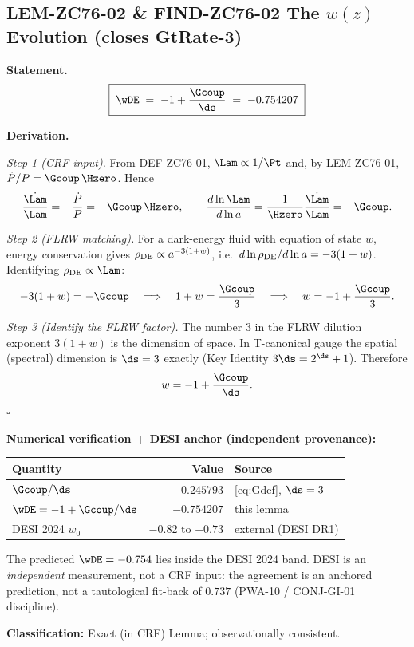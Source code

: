 \documentclass[12pt, a4paper]{article}
\begin{document}
\subsection{LEM-ZC76-02 \& FIND-ZC76-02\quad
  The $w(z)$ Evolution (closes GtRate-3)}
\label{sec:lem02}


\begin{formalbox}[title={LEM-ZC76-02: Dark-Energy Equation of State
  ($R_0{\to}R_{\max}$, Exact in CRF)}]

\textbf{Statement.}
\begin{equation}
  \boxed{\;\wDE \;=\; -1 + \frac{\Gcoup}{\ds}
  \;=\; -0.754207\;}
  \label{eq:wDE}
\end{equation}

\textbf{Derivation.}

\textit{Step 1 (CRF input).}
From DEF-ZC76-01, $\Lam \propto 1/\Pt$ and, by LEM-ZC76-01,
$\dot{P}/P = \Gcoup\,\Hzero$. Hence
\[
  \frac{\dot{\Lam}}{\Lam} = -\frac{\dot{P}}{P} = -\Gcoup\,\Hzero,
  \qquad
  \frac{d\ln\Lam}{d\ln a} = \frac{1}{\Hzero}\frac{\dot{\Lam}}{\Lam}
  = -\Gcoup .
\]

\textit{Step 2 (FLRW matching).}
For a dark-energy fluid with equation of state $w$, energy conservation
gives $\rho_{\rm DE}\propto a^{-3(1+w)}$, i.e.\
$d\ln\rho_{\rm DE}/d\ln a = -3(1+w)$. Identifying
$\rho_{\rm DE}\propto\Lam$:
\[
  -3(1+w) = -\Gcoup
  \quad\Longrightarrow\quad
  1 + w = \frac{\Gcoup}{3}
  \quad\Longrightarrow\quad
  w = -1 + \frac{\Gcoup}{3}.
\]

\textit{Step 3 (Identify the FLRW factor).}
The number $3$ in the FLRW dilution exponent $3(1+w)$ is the dimension
of space. In T-canonical gauge the spatial (spectral) dimension is
$\ds = 3$ exactly (Key Identity $3\ds = 2^{\ds}+1$). Therefore
\[
  w = -1 + \frac{\Gcoup}{\ds}.
\]
\hfill$\square$

\textbf{Numerical verification + DESI anchor (independent provenance):}
\begin{center}
{\small\renewcommand{\arraystretch}{1.25}
\begin{tabular}{@{}lrl@{}}
\toprule
Quantity & Value & Source \\
\midrule
$\Gcoup/\ds$            & $0.245793$ & \eqref{eq:Gdef}, $\ds=3$ \\
$\wDE = -1 + \Gcoup/\ds$ & $-0.754207$ & this lemma \\
DESI 2024 $w_0$         & $-0.82$ to $-0.73$ & external (DESI DR1) \\
\bottomrule
\end{tabular}}
\end{center}
The predicted $\wDE = -0.754$ lies inside the DESI 2024 band. DESI is an
\emph{independent} measurement, not a CRF input: the agreement is an
anchored prediction, not a tautological fit-back of $0.737$
(PWA-10 / CONJ-GI-01 discipline).

\textbf{Classification:} Exact (in CRF) Lemma; observationally
consistent.
\end{formalbox}
\end{document}
